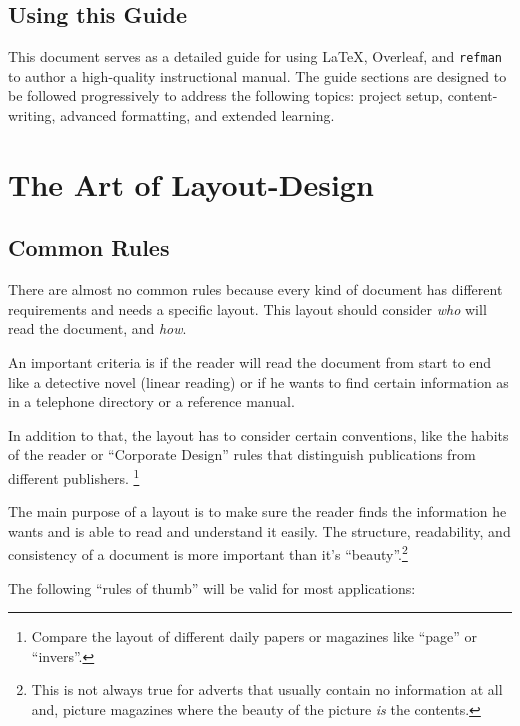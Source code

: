 \documentclass[twoside,a4paper]{refart}
\begin{document}
\subsection{Using this Guide}
This document serves as a detailed guide for using \LaTeX, Overleaf, and \texttt{refman} to author a high-quality instructional manual. The guide sections are designed to be followed progressively to address the following topics: project setup, content-writing, advanced formatting, and extended learning.

\section{The Art of Layout-Design}
\label{design}
\label{Layout-Design}

\subsection{Common Rules}

There are almost no common rules because every kind of document has 
different requirements and needs a specific layout. This layout 
should consider \emph{who} will read the document, and \emph{how}.

An important criteria is if the reader will read the document from 
start to end like a detective novel (linear reading) or if he wants to 
find certain information as in a telephone directory or a 
reference manual.  

In addition to that, the layout has to consider certain conventions, 
like the habits of the reader or ``Corporate Design''  rules that distinguish publications from different publishers.  
\footnote{Compare the layout of different daily papers or magazines 
like ``page'' or ``invers''.}

\attention
The main purpose of a layout is to make sure the reader finds the 
information he wants and is able to read and understand it easily.
The structure, readability, and consistency of a document is more 
important than it's ``beauty''.\footnote{This is not always true for 
adverts that usually contain no information at all and, picture 
magazines where the beauty of the picture \emph{is} the contents.}

The following ``rules of thumb'' will be valid 
for most applications:
\end{document}
